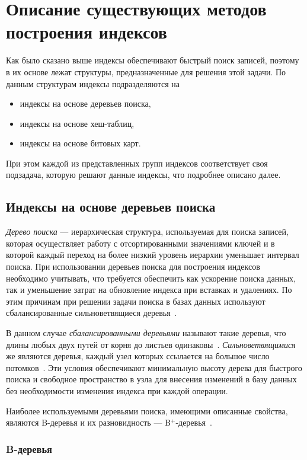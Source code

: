 \chapter{Описание существующих методов построения индексов\label{methods}}

Как было сказано выше индексы обеспечивают быстрый поиск записей, поэтому в их
основе лежат структуры, предназначенные для решения этой задачи. По данным
структурам индексы подразделяются на
\begin{itemize}
    \item индексы на основе деревьев поиска,
    \item индексы на основе хеш-таблиц,
    \item индексы на основе битовых карт.
\end{itemize}

При этом каждой из представленных групп индексов соответствует своя подзадача,
которую решают данные индексы, что подробнее описано далее.

\section{Индексы на основе деревьев поиска}

\textit{Дерево поиска} --- иерархическая структура, используемая для поиска
записей, которая осуществляет работу с отсортированными значениями ключей и в
которой каждый переход на более низкий уровень иерархии уменьшает интервал
поиска. При использовании деревьев поиска для построения индексов необходимо
учитывать, что требуется обеспечить как ускорение поиска данных, так и
уменьшение затрат на обновление индекса при вставках и удалениях. По этим
причинам при решении задачи поиска в базах данных используют сбалансированные
сильноветвящиеся деревья~\cite{arki}.

В данном случае \textit{сбалансированными деревьями} называют такие деревья, что
длины любых двух путей от корня до листьев одинаковы~\cite{encycl}.
\textit{Сильноветвящимися} же являются деревья, каждый узел которых ссылается на
большое число потомков~\cite{squares}.  Эти условия обеспечивают минимальную
высоту дерева для быстрого поиска и свободное пространство в узла для внесения
изменений в базу данных без необходимости изменения индекса при каждой операции.

Наиболее используемыми деревьями поиска, имеющими описанные свойства, являются
B-деревья и их разновидность --- B$^+$-деревья~\cite{arki}.

\subsection{B-деревья}

